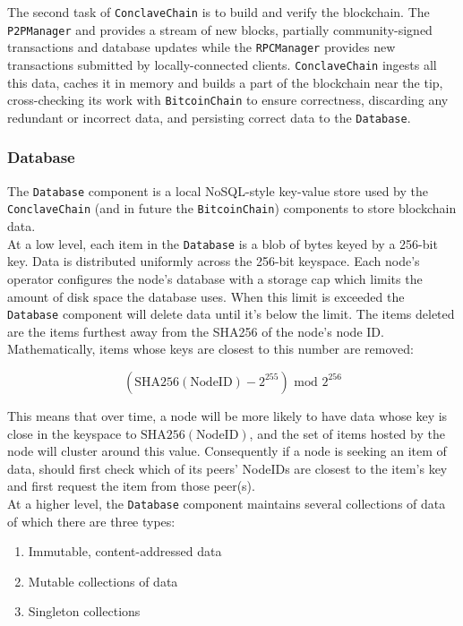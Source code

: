 \documentclass{report}
\begin{document}
			The second task of \texttt{ConclaveChain} is to build and verify the blockchain. The \texttt{P2PManager} and provides a stream of new blocks, partially community-signed transactions and database updates while the \texttt{RPCManager} provides new transactions submitted by locally-connected clients. \texttt{ConclaveChain} ingests all this data, caches it in memory and builds a part of the blockchain near the tip, cross-checking its work with \texttt{BitcoinChain} to ensure correctness, discarding any redundant or incorrect data, and persisting correct data to the \texttt{Database}.
			
			\subsubsection{Database}
			The \texttt{Database} component is a local NoSQL-style key-value store used by the \texttt{ConclaveChain} (and in future the \texttt{BitcoinChain}) components to store blockchain data. \\
			
			At a low level, each item in the \texttt{Database} is a blob of bytes keyed by a 256-bit key. Data is distributed uniformly across the 256-bit keyspace. Each node's operator configures the node's database with a storage cap which limits the amount of disk space the database uses. When this limit is exceeded the \texttt{Database} component will delete data until it's below the limit. The items deleted are the items furthest away from the SHA256 of the node's node ID. Mathematically, items whose keys are closest to this number are removed:
			
			\[ (\textrm{SHA256}(\textrm{NodeID}) - 2^{255}) \textrm{ mod } 2^{256} \]
			
			This means that over time, a node will be more likely to have data whose key is close in the keyspace  to $\textrm{SHA256}(\textrm{NodeID})$, and the set of items hosted by the node will cluster around this value. Consequently if a node is seeking an item of data, should first check which of its peers' NodeIDs are closest to the item's key and first request the item from those peer(s). \\
			
			At a higher level, the \texttt{Database} component maintains several collections of data of which there are three types:
			
			\begin{enumerate}
				\item Immutable, content-addressed data
				\item Mutable collections of data
				\item Singleton collections
			\end{enumerate}
			
\end{document}
